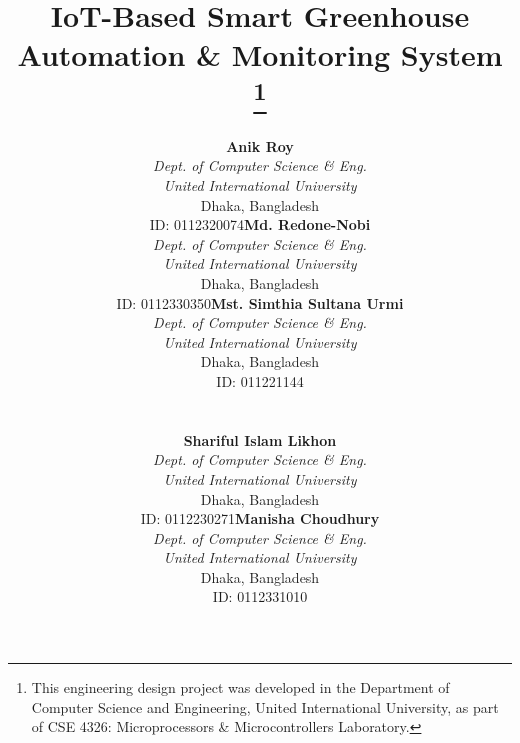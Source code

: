 \documentclass[conference]{IEEEtran}
\begin{document}
\title{IoT-Based Smart Greenhouse Automation \& Monitoring System\\
\thanks{This engineering design project was developed in the Department of Computer Science and Engineering, United International University, as part of CSE 4326: Microprocessors \& Microcontrollers Laboratory.}
}

\author{
\begin{tabular}[t]{p{} p{} p{}}
\centering \textbf{Anik Roy} \\
\centering \small \textit{Dept. of Computer Science \& Eng.} \\
\centering \small \textit{United International University} \\
\centering \small Dhaka, Bangladesh \\
\centering \small ID: 0112320074
&
\centering \textbf{Md. Redone-Nobi} \\
\centering \small \textit{Dept. of Computer Science \& Eng.} \\
\centering \small \textit{United International University} \\
\centering \small Dhaka, Bangladesh \\
\centering \small ID: 0112330350
&
\centering \textbf{Mst. Simthia Sultana Urmi} \\
\centering \small \textit{Dept. of Computer Science \& Eng.} \\
\centering \small \textit{United International University} \\
\centering \small Dhaka, Bangladesh \\
\centering \small ID: 011221144
\end{tabular}
\\[2ex]
\begin{tabular}[t]{p{} p{}}
\centering \textbf{Shariful Islam Likhon} \\
\centering \small \textit{Dept. of Computer Science \& Eng.} \\
\centering \small \textit{United International University} \\
\centering \small Dhaka, Bangladesh \\
\centering \small ID: 0112230271
&
\centering \textbf{Manisha Choudhury} \\
\centering \small \textit{Dept. of Computer Science \& Eng.} \\
\centering \small \textit{United International University} \\
\centering \small Dhaka, Bangladesh \\
\centering \small ID: 0112331010
\end{tabular}
}
\end{document}

